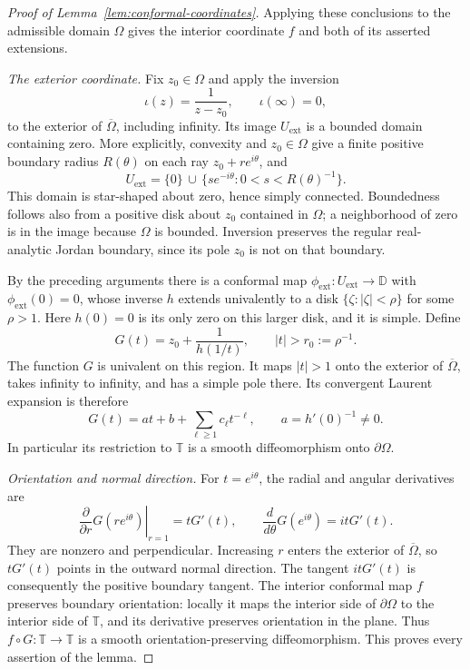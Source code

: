 \documentclass[11pt]{article}
\newcommand{\D}{\mathbb D}
\newcommand{\T}{\mathbb T}
\theoremstyle{definition}
\theoremstyle{remark}
\numberwithin{equation}{section}
\begin{document}
\begin{proof}[Proof of Lemma~\ref{lem:conformal-coordinates}]
Applying these conclusions to the admissible domain $\Omega$ gives the
interior coordinate $f$ and both of its asserted extensions.

\medskip
\emph{The exterior coordinate.}
Fix $z_0\in\Omega$ and apply the inversion
\[
 \iota(z)=\frac{1}{z-z_0},\qquad \iota(\infty)=0,
\]
to the exterior of $\overline\Omega$, including infinity. Its image
$U_{\mathrm{ext}}$ is a bounded domain containing zero. More explicitly,
convexity and $z_0\in\Omega$ give a finite positive boundary radius
$R(\theta)$ on each ray $z_0+r e^{i\theta}$, and
\[
 U_{\mathrm{ext}}
 =\{0\}\,\cup\,
   \bigl\{s e^{-i\theta}:0<s<R(\theta)^{-1}\bigr\}.
\]
This domain is star-shaped about zero, hence simply connected.
Boundedness follows also from a positive disk about $z_0$ contained
in $\Omega$; a neighborhood of zero is in the image because $\Omega$
is bounded. Inversion preserves the regular real-analytic Jordan
boundary, since its pole $z_0$ is not on that boundary.

By the preceding arguments there is a conformal map
$\phi_{\mathrm{ext}}:U_{\mathrm{ext}}\to\D$ with
$\phi_{\mathrm{ext}}(0)=0$, whose inverse $h$ extends univalently
to a disk $\{\zeta:|\zeta|<\rho\}$ for some $\rho>1$.
Here $h(0)=0$ is its only zero on this larger disk, and it is simple.
Define
\[
 G(t)=z_0+\frac{1}{h(1/t)},\qquad |t|>r_0:=\rho^{-1}.
\]
The function $G$ is univalent on this region. It maps $|t|>1$ onto
the exterior of $\overline\Omega$, takes infinity to infinity, and
has a simple pole there. Its convergent Laurent expansion is therefore
\[
 G(t)=at+b+\sum_{\ell\ge1}c_\ell t^{-\ell},
 \qquad a=h'(0)^{-1}\ne0.
\]
In particular its restriction to $\T$ is a smooth diffeomorphism onto
$\partial\Omega$.

\medskip
\emph{Orientation and normal direction.}
For $t=e^{i\theta}$, the radial and angular derivatives are
\[
 \left.\frac{\partial}{\partial r}G(re^{i\theta})\right|_{r=1}
 =tG'(t),
 \qquad
 \frac{d}{d\theta}G(e^{i\theta})=itG'(t).
\]
They are nonzero and perpendicular. Increasing $r$ enters the exterior
of $\overline\Omega$, so $tG'(t)$ points in the outward normal direction.
The tangent $itG'(t)$ is consequently the positive boundary tangent.
The interior conformal map $f$ preserves boundary orientation: locally
it maps the interior side of $\partial\Omega$ to the interior side of
$\T$, and its derivative preserves orientation in the plane.
Thus $f\circ G:\T\to\T$ is a smooth orientation-preserving
diffeomorphism. This proves every assertion of the lemma.
\end{proof}


\end{document}
